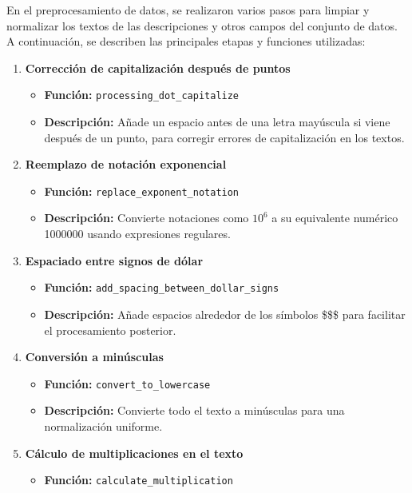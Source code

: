 \documentclass{article}
\begin{document}
    En el preprocesamiento de datos, se realizaron varios pasos para 
    limpiar y normalizar los textos de las descripciones y otros campos del 
    conjunto de datos. A continuación, se describen las principales etapas 
    y funciones utilizadas:

    \begin{enumerate}
        \item \textbf{Corrección de capitalización después de puntos}
        \begin{itemize}
            \item \textbf{Función:} \texttt{processing\_dot\_capitalize}
            \item \textbf{Descripción:} Añade un espacio antes de una letra mayúscula si viene después de un punto, para corregir errores de capitalización en los textos.
        \end{itemize}
        \item \textbf{Reemplazo de notación exponencial}
        \begin{itemize}
            \item \textbf{Función:} \texttt{replace\_exponent\_notation}
            \item \textbf{Descripción:} Convierte notaciones como $10^6$ a su equivalente numérico 1000000 usando expresiones regulares.
        \end{itemize}
        \item \textbf{Espaciado entre signos de dólar}
        \begin{itemize}
            \item \textbf{Función:} \texttt{add\_spacing\_between\_dollar\_signs}
            \item \textbf{Descripción:} Añade espacios alrededor de los símbolos \$\$\$ para facilitar el procesamiento posterior.
        \end{itemize}
        \item \textbf{Conversión a minúsculas}
        \begin{itemize}
            \item \textbf{Función:} \texttt{convert\_to\_lowercase}
            \item \textbf{Descripción:} Convierte todo el texto a minúsculas para una normalización uniforme.
        \end{itemize}
        \item \textbf{Cálculo de multiplicaciones en el texto}
        \begin{itemize}
            \item \textbf{Función:} \texttt{calculate\_multiplication}

\end{itemize}
\end{enumerate}
\end{document}
